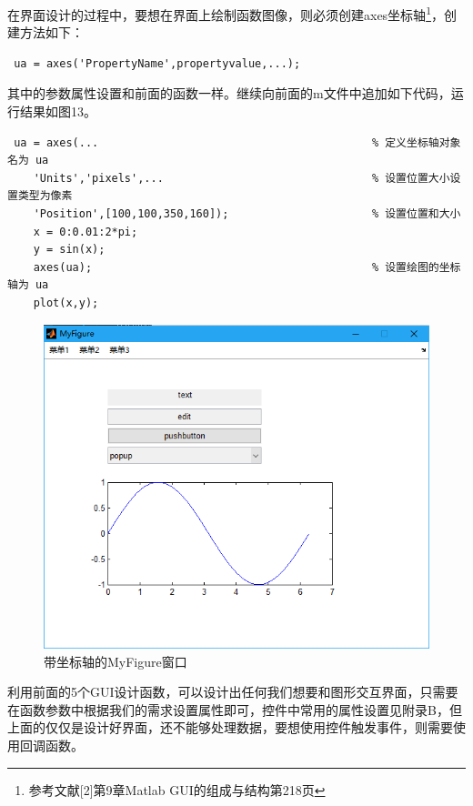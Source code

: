 \begin{enumerate}
	\qquad 在界面设计的过程中，要想在界面上绘制函数图像，则必须创建axes坐标轴\footnote{参考文献[2]第9章Matlab GUI的组成与结构第218页}，创建方法如下：
	\begin{lstlisting}
 ua = axes('PropertyName',propertyvalue,...);\end{lstlisting}
 	其中的参数属性设置和前面的函数一样。继续向前面的m文件中追加如下代码，运行结果如图13。
	 \begin{lstlisting}
 ua = axes(...											% 定义坐标轴对象名为 ua
	'Units','pixels',...								% 设置位置大小设置类型为像素
	'Position',[100,100,350,160]);						% 设置位置和大小
	x = 0:0.01:2*pi;
	y = sin(x);
	axes(ua);											% 设置绘图的坐标轴为 ua
	plot(x,y);\end{lstlisting}
	\begin{figure}[H]
		\centering
		\includegraphics[scale=0.35]{MyFigure_axes}
		\caption{带坐标轴的MyFigure窗口}
	\end{figure}
\end{enumerate}

利用前面的5个GUI设计函数，可以设计出任何我们想要和图形交互界面，只需要在函数参数中根据我们的需求设置属性即可，控件中常用的属性设置见附录B，但上面的仅仅是设计好界面，还不能够处理数据，要想使用控件触发事件，则需要使用回调函数。
